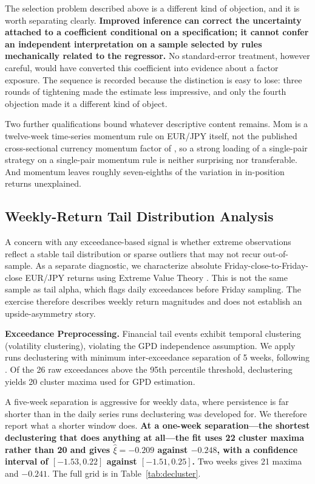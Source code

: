 \documentclass[11pt]{article}
\begin{document}
The selection problem described above is a different kind of objection, and it is worth separating clearly. \textbf{Improved inference can correct the uncertainty attached to a coefficient conditional on a specification; it cannot confer an independent interpretation on a sample selected by rules mechanically related to the regressor.} No standard-error treatment, however careful, would have converted this coefficient into evidence about a factor exposure. The sequence is recorded because the distinction is easy to lose: three rounds of tightening made the estimate less impressive, and only the fourth objection made it a different kind of object.

Two further qualifications bound whatever descriptive content remains. Mom is a twelve-week time-series momentum rule on EUR/JPY itself, not the published cross-sectional currency momentum factor of \citet{menkhoff2012currency}, so a strong loading of a single-pair strategy on a single-pair momentum rule is neither surprising nor transferable. And momentum leaves roughly seven-eighths of the variation in in-position returns unexplained.

\subsection{Weekly-Return Tail Distribution Analysis}

A concern with any exceedance-based signal is whether extreme observations reflect a stable tail distribution or sparse outliers that may not recur out-of-sample. As a separate diagnostic, we characterize absolute Friday-close-to-Friday-close EUR/JPY returns using Extreme Value Theory \citep{mcneil2000estimation, coles2001introduction}. This is not the same sample as tail alpha, which flags daily exceedances before Friday sampling. The exercise therefore describes weekly return magnitudes and does not establish an upside-asymmetry story.

\textbf{Exceedance Preprocessing.} Financial tail events exhibit temporal clustering (volatility clustering), violating the GPD independence assumption. We apply runs declustering with minimum inter-exceedance separation of 5 weeks, following \citet{coles2001introduction}. Of the 26 raw exceedances above the 95th percentile threshold, declustering yields 20 cluster maxima used for GPD estimation.

A five-week separation is aggressive for weekly data, where persistence is far shorter than in the daily series runs declustering was developed for. We therefore report what a shorter window does. \textbf{At a one-week separation---the shortest declustering that does anything at all---the fit uses 22 cluster maxima rather than 20 and gives $\hat{\xi} = -0.209$ against $-0.248$, with a confidence interval of $[-1.53, 0.22]$ against $[-1.51, 0.25]$.} Two weeks gives 21 maxima and $-0.241$. The full grid is in Table~\ref{tab:decluster}.
\end{document}
